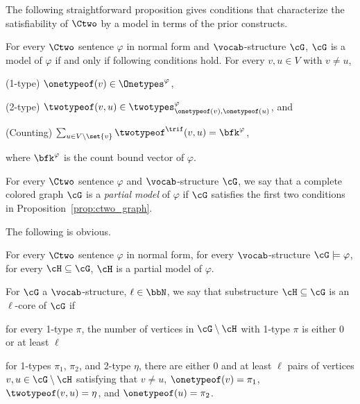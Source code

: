 The following straightforward proposition gives
conditions that characterize the satisfiability of $\Ctwo$ by a model in terms of the prior constructs.
\begin{proposition}\label{prop:ctwo_graph}
    For every $\Ctwo$ sentence $\varphi$ in normal form and $\vocab$-structure $\cG$,
    $\cG$ is a model of $\varphi$ if and only if following conditions hold.
    For every $v, u \in V$ with $v \neq u$,
    \begin{compactitem}
        \item (1-type) $\onetypeof(v) \in \Onetypes^\varphi$,
        \item (2-type) $\twotypeof(v, u) \in \twotypes^\varphi_{\onetypeof(v), \onetypeof(u)}$, and
        \item (Counting) $\sum_{u \in V \setminus \set{v}} \twotypeof^\trif(v, u) = \bfk^\varphi$,
    \end{compactitem}
    where $\bfk^\varphi$ is the count bound vector of $\varphi$.
\end{proposition}

\begin{definition} \label{def:partial}
    For every $\Ctwo$ sentence $\varphi$ and $\vocab$-structure $\cG$,
    we say that a complete colored graph $\cG$ is a \emph{partial model} of $\varphi$
    if $\cG$ satisfies the first two conditions in Proposition~\ref{prop:ctwo_graph}.
\end{definition}

The following is obvious.
\begin{lemma}\label{lem:core_partial_model}
    For every $\Ctwo$ sentence $\varphi$ in normal form,
    for every $\vocab$-structure $\cG \models \varphi$,
    for every $\cH \subseteq \cG$,
    $\cH$ is a partial model of $\varphi$.
\end{lemma}

\begin{definition} \label{def:core}
    For $\cG$ a $\vocab$-structure, $\ell \in \bbN$,
    we say that substructure $\cH \subseteq \cG$ is an $\ell$-core of $\cG$ if 
    \begin{compactitem}
        \item for every 1-type $\pi$,
        the number of vertices in $\cG \setminus \cH$
        with 1-type $\pi$ is either $0$ or at least $\ell$
        \item for  1-types $\pi_1$, $\pi_2$, and 2-type $\eta$,
        there are either $0$ and at least $\ell$
        pairs of vertices $v, u \in \cG \setminus \cH$ satisfying that
        $v \neq u$,
        $\onetypeof(v) = \pi_1$,
        $\twotypeof(v, u) = \eta$,
        and $\onetypeof(u) = \pi_2$.
    \end{compactitem}
\end{definition}

